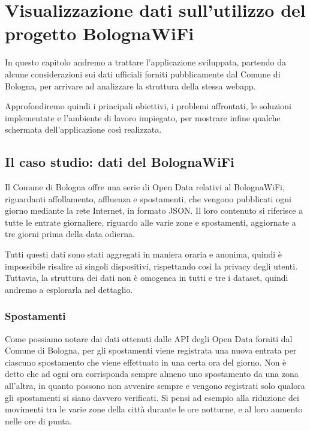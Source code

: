 \clearpage{\pagestyle{empty}\cleardoublepage}
\chapter{Visualizzazione dati sull'utilizzo del progetto BolognaWiFi}
In questo capitolo andremo a trattare l'applicazione sviluppata, partendo da alcune considerazioni sui dati ufficiali forniti pubblicamente dal Comune di Bologna, per arrivare ad analizzare la struttura della stessa webapp.

Approfondiremo quindi i principali obiettivi, i problemi affrontati, le soluzioni implementate e l'ambiente di lavoro impiegato, per mostrare infine qualche schermata dell'applicazione così realizzata.

\section{Il caso studio: dati del BolognaWiFi}
Il Comune di Bologna offre una serie di Open Data relativi al BolognaWiFi, riguardanti affollamento, affluenza e spostamenti, che vengono pubblicati ogni giorno mediante la rete Internet, in formato JSON. Il loro contenuto si riferisce a tutte le entrate giornaliere, riguardo alle varie zone e spostamenti, aggiornate a tre giorni prima della data odierna.


Tutti questi dati sono stati aggregati in maniera oraria e anonima, quindi è impossibile risalire ai singoli dispositivi, rispettando così la privacy degli utenti. Tuttavia, la struttura dei dati non è omogenea in tutti e tre i dataset, quindi andremo a esplorarla nel dettaglio.

\subsection{Spostamenti}
Come possiamo notare dai dati ottenuti dalle API degli Open Data forniti dal Comune di Bologna, per gli spostamenti viene registrata una nuova entrata per ciascuno spostamento che viene effettuato in una certa ora del giorno. Non è detto che ad ogni ora corrisponda sempre almeno uno spostamento da una zona all'altra, in quanto possono non avvenire sempre e vengono registrati solo qualora gli spostamenti si siano davvero verificati. Si pensi ad esempio alla riduzione dei movimenti tra le varie zone della città durante le ore notturne, e al loro aumento nelle ore di punta.


